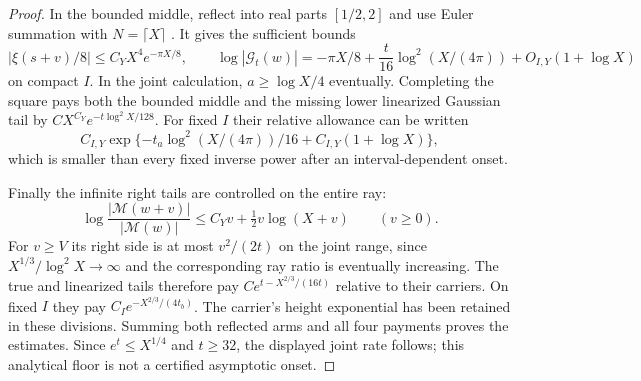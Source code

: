 \begin{proof}
In the bounded middle, reflect into real parts $[1/2,2]$ and use Euler
summation with $N=\lceil X\rceil$
\cite[25.2.8]{DLMFZetaOuter2026}.  It gives the sufficient bounds
\begin{equation}
 |\xi(s+v)/8|\le C_YX^4e^{-\pi X/8},\qquad
 \log|\mathcal G_t(w)|=-\pi X/8+
       \frac t{16}\log^2(X/(4\pi))+O_{I,Y}(1+\log X)
 \label{eq:linear-middle-carrier}
\end{equation}
on compact $I$.  In the joint calculation, $a\ge\log X/4$ eventually.
Completing the square pays both the bounded middle and the missing
lower linearized Gaussian tail by
$CX^{C_Y}e^{-t\log^2X/128}$.  For fixed $I$ their relative allowance
can be written
\[
 C_{I,Y}\exp\{-t_a\log^2(X/(4\pi))/16+C_{I,Y}(1+\log X)\},
\]
which is smaller than every fixed inverse power after an
interval-dependent onset.

Finally the infinite right tails are controlled on the entire ray:
\begin{equation}
 \log\frac{|\mathcal M(w+v)|}{|\mathcal M(w)|}
       \le C_Yv+\tfrac12v\log(X+v)\qquad(v\ge0).
 \label{eq:linear-ray-bound}
\end{equation}
For $v\ge V$ its right side is at most $v^2/(2t)$ on the joint range,
since $X^{1/3}/\log^2X\to\infty$ and the corresponding ray ratio is
eventually increasing.  The true and linearized tails therefore pay
$Ce^{t-X^{2/3}/(16t)}$ relative to their carriers.  On fixed $I$ they
pay $C_Ie^{-X^{2/3}/(4t_b)}$.  The carrier's height exponential has
been retained in these divisions.  Summing both reflected arms and
all four payments proves the estimates.  Since $e^t\le X^{1/4}$ and
$t\ge32$, the displayed joint rate follows; this analytical floor is
not a certified asymptotic onset.
\end{proof}

